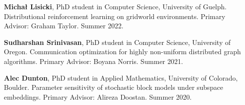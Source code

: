 \begin{innerlist}
  \item[] \textbf{Micha{\l}
    Lisicki},
  PhD student in Computer Science,
  University of Guelph.
  Distributional reinforcement learning on gridworld environments.
  Primary Advisor: Graham Taylor.
  Summer 2022.

  \item[] \textbf{Sudharshan Srinivasan},
  PhD student in Computer Science,
  University of Oregon.
  Communication optimization for highly non-uniform distributed graph algorithms.
  Primary Advisor: Boyana Norris.
  Summer 2021.

  \item[] \textbf{Alec Dunton},
  PhD student in Applied Mathematics,
  University of Colorado, Boulder.
  Parameter sensitivity of stochastic block models under subspace embeddings.
  Primary Advisor: Alireza Doostan.
  Summer 2020.

\end{innerlist}
